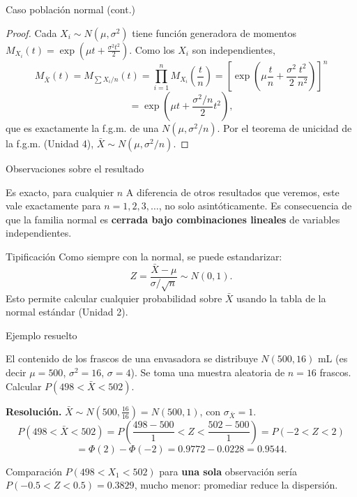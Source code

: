 \documentclass[aspectratio=169,11pt]{beamer}
\begin{document}
\begin{frame}{Caso población normal (cont.)}
\begin{proof}
Cada $X_i \sim N(\mu,\sigma^2)$ tiene función generadora de momentos $M_{X_i}(t) = \exp\left(\mu t + \frac{\sigma^2 t^2}{2}\right)$. Como los $X_i$ son independientes,
$$M_{\bar X}(t) = M_{\sum X_i/n}(t) = \prod_{i=1}^n M_{X_i}\!\left(\frac{t}{n}\right) = \left[\exp\left(\mu \frac{t}{n} + \frac{\sigma^2}{2}\frac{t^2}{n^2}\right)\right]^n$$
$$= \exp\left(\mu t + \frac{\sigma^2/n}{2}t^2\right),$$
que es exactamente la f.g.m. de una $N(\mu,\sigma^2/n)$. Por el teorema de unicidad de la f.g.m. (Unidad 4), $\bar X \sim N(\mu,\sigma^2/n)$. \qedhere
\end{proof}
\end{frame}

\begin{frame}{Observaciones sobre el resultado}
\begin{alertblock}{Es exacto, para cualquier $n$}
A diferencia de otros resultados que veremos, este vale exactamente para $n=1,2,3,\dots$, no solo asintóticamente. Es consecuencia de que la familia normal es \textbf{cerrada bajo combinaciones lineales} de variables independientes.
\end{alertblock}

\begin{block}{Tipificación}
Como siempre con la normal, se puede estandarizar:
$$Z = \frac{\bar X - \mu}{\sigma/\sqrt n} \sim N(0,1).$$
Esto permite calcular cualquier probabilidad sobre $\bar X$ usando la tabla de la normal estándar (Unidad 2).
\end{block}
\end{frame}

\begin{frame}{Ejemplo resuelto}
\begin{example}
El contenido de los frascos de una envasadora se distribuye $N(500, 16)$ mL (es decir $\mu=500$, $\sigma^2=16$, $\sigma=4$). Se toma una muestra aleatoria de $n=16$ frascos. Calcular $P(498 < \bar X < 502)$.

\textbf{Resolución.} $\bar X \sim N\left(500, \frac{16}{16}\right) = N(500,1)$, con $\sigma_{\bar X}=1$.
$$P(498<\bar X<502) = P\left(\frac{498-500}{1} < Z < \frac{502-500}{1}\right) = P(-2<Z<2)$$
$$= \Phi(2)-\Phi(-2) = 0.9772 - 0.0228 = 0.9544.$$
\end{example}

\begin{block}{Comparación}
$P(498<X_1<502)$ para \textbf{una sola} observación sería $P(-0.5<Z<0.5)=0.3829$, mucho menor: promediar reduce la dispersión.
\end{block}
\end{frame}
\end{document}
